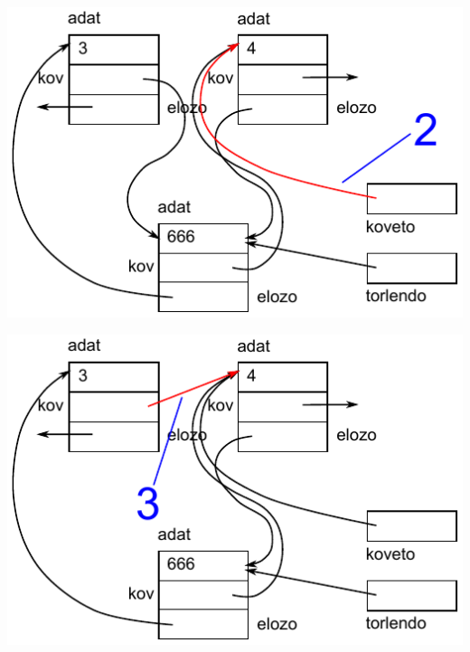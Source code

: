 \begin{frame}
  \begin{center}
    \includegraphics[scale=0.55]{lista2/list2-11.pdf}
  \end{center}
  \vspace{-.4cm}
  \scriptsize
  \begin{exampleblock}{}
    \tiny
    \vspace{-.2cm}
    
    \vspace{-.2cm}
  \end{exampleblock}
\end{frame}

\begin{frame}
  \begin{center}
    \includegraphics[scale=0.55]{lista2/list2-12.pdf}
  \end{center}
  \vspace{-.4cm}
  \scriptsize
  \begin{exampleblock}{}
    \tiny
    \vspace{-.2cm}
    
    \vspace{-.2cm}
  \end{exampleblock}
\end{frame}

